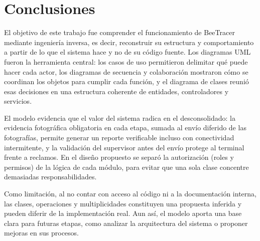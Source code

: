 \chapter{Conclusiones}
\label{cap:conclusiones}

El objetivo de este trabajo fue comprender el funcionamiento de BeeTracer mediante ingeniería
inversa, es decir, reconstruir su estructura y comportamiento a partir de lo que el sistema hace y
no de su código fuente. Los diagramas UML fueron la herramienta central: los casos de uso
permitieron delimitar qué puede hacer cada actor, los diagramas de secuencia y colaboración
mostraron cómo se coordinan los objetos para cumplir cada función, y el diagrama de clases reunió
esas decisiones en una estructura coherente de entidades, controladores y servicios.

El modelo evidencia que el valor del sistema radica en el desconsolidado: la evidencia fotográfica
obligatoria en cada etapa, sumada al envío diferido de las fotografías, permite generar un reporte
verificable incluso con conectividad intermitente, y la validación del supervisor antes del envío
protege al terminal frente a reclamos. En el diseño propuesto se separó la autorización (roles y
permisos) de la lógica de cada módulo, para evitar que una sola clase concentre demasiadas
responsabilidades.

Como limitación, al no contar con acceso al código ni a la documentación interna, las clases,
operaciones y multiplicidades constituyen una propuesta inferida y pueden diferir de la
implementación real. Aun así, el modelo aporta una base clara para futuras etapas, como analizar la
arquitectura del sistema o proponer mejoras en sus procesos.
